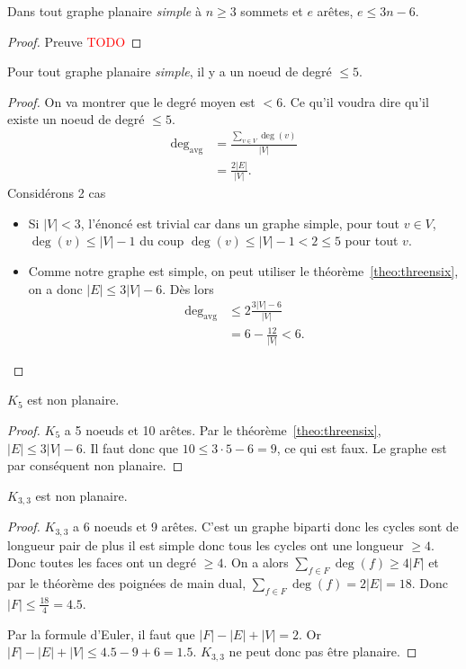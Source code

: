 \begin{mytheo}
  \label{theo:threensix}
  Dans tout graphe planaire \emph{simple} à $n \geq 3$ sommets et $e$ arêtes,
  $e \leq 3n - 6$.
  \begin{proof}
    Preuve \textcolor{red}{TODO}
  \end{proof}
\end{mytheo}

\begin{mytheo}
  Pour tout graphe planaire \emph{simple}, il y a un noeud de degré $\leq 5$.
  \begin{proof}
    On va montrer que le degré moyen est $< 6$.
    Ce qu'il voudra dire qu'il existe un noeud de degré $\leq 5$.
    \begin{align*}
      \deg_{\mathrm{avg}} & = \frac{\sum_{v\in V} \deg(v)}{|V|}\\
                          & = \frac{2|E|}{|V|}.
    \end{align*}
    Considérons 2 cas
    \begin{itemize}
      \item Si $|V| < 3$, l'énoncé est trivial car dans un graphe simple,
        pour tout $v \in V$, $\deg(v) \leq |V|-1$ du coup
        $\deg(v) \leq |V| - 1 < 2 \leq 5$ pour tout $v$.
      \item
        Comme notre graphe est simple,
        on peut utiliser le théorème~\ref{theo:threensix},
        on a donc $|E| \leq 3|V| - 6$.
        Dès lors
        \begin{align*}
          \deg_{\mathrm{avg}} & \leq 2\frac{3|V|-6}{|V|}\\
                              & = 6 - \frac{12}{|V|} < 6.
        \end{align*}
    \end{itemize}
  \end{proof}
\end{mytheo}

\begin{mycorr}
  $K_5$ est non planaire.
  \begin{proof}
    $K_5$ a 5 noeuds et 10 arêtes.
    Par le théorème~\ref{theo:threensix}, $|E| \leq 3|V| - 6$.
    Il faut donc que $10 \leq 3 \cdot 5 - 6 = 9$, ce qui est faux.
    Le graphe est par conséquent non planaire.
  \end{proof}
\end{mycorr}

\begin{mycorr}
  $K_{3,3}$ est non planaire.
  \begin{proof}
    $K_{3,3}$ a 6 noeuds et 9 arêtes.
    C'est un graphe biparti donc les cycles sont de longueur pair de plus il est simple donc tous les cycles ont une longueur $\geq 4$.
    Donc toutes les faces ont un degré $\geq 4$.
    On a alors $\sum_{f \in F} \deg(f) \geq 4|F|$ et par le théorème des poignées de main dual, $\sum_{f \in F} \deg(f) = 2|E| = 18$.
    Donc $|F| \leq \frac{18}{4} = 4.5$.

    Par la formule d'Euler, il faut que
    $|F| - |E| + |V| = 2$.
    Or $|F| - |E| + |V| \leq 4.5 - 9 + 6 = 1.5$.
    $K_{3,3}$ ne peut donc pas être planaire.
  \end{proof}
\end{mycorr}

